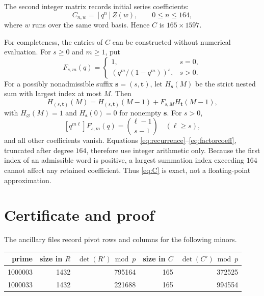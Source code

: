 \documentclass[11pt]{article}
\begin{document}
The second integer matrix records initial series coefficients:
\begin{equation}\label{eq:C}
 C_{n,w}=[q^n]Z(w),\qquad 0\leq n\leq164,
\end{equation}
where \(w\) runs over the same word basis.  Hence \(C\) is
\(165\times1597\).

For completeness, the entries of \(C\) can be constructed without numerical
evaluation.  For \(s\geq0\) and \(m\geq1\), put
\[
 F_{s,m}(q)=
 \begin{cases}
 1,&s=0,\\[2pt]
 \left(q^m/(1-q^m)\right)^s,&s>0.
 \end{cases}
\]
For a possibly nonadmissible suffix \(\boldsymbol{s}=(s,\boldsymbol{t})\),
let \(H_{\boldsymbol{s}}(M)\) be the strict nested sum with largest index at
most \(M\).  Then
\begin{equation}\label{eq:recurrence}
 H_{(s,\boldsymbol{t})}(M)
 =H_{(s,\boldsymbol{t})}(M-1)
  +F_{s,M}H_{\boldsymbol{t}}(M-1),
\end{equation}
with \(H_{\varnothing}(M)=1\) and
\(H_{\boldsymbol{s}}(0)=0\) for nonempty \(\boldsymbol{s}\).  For \(s>0\),
\begin{equation}\label{eq:factorcoeff}
 [q^{m\ell}]F_{s,m}(q)=\binom{\ell-1}{s-1}
 \quad(\ell\geq s),
\end{equation}
and all other coefficients vanish.  Equations
\eqref{eq:recurrence}--\eqref{eq:factorcoeff}, truncated after degree \(164\),
therefore use integer arithmetic only.  Because the first index of an
admissible word is positive, a largest summation index exceeding \(164\)
cannot affect any retained coefficient.  Thus \eqref{eq:C} is exact, not a
floating-point approximation.

\section{Certificate and proof}

The ancillary files record pivot rows and columns for the following minors.

\begin{center}
\begin{tabular}{@{}rrrrr@{}}
\toprule
prime & size in \(R\) & \(\det(R')\bmod p\)
      & size in \(C\) & \(\det(C')\bmod p\)\\
\midrule
1000003 & 1432 & 795164 & 165 & 372525\\
1000033 & 1432 & 221688 & 165 & 994554\\
\bottomrule
\end{tabular}
\end{center}
\end{document}
